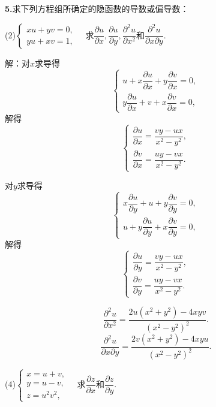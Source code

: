\documentclass[12pt, a4paper]{article}
\begin{document}
\textbf{5.}求下列方程组所确定的隐函数的导数或偏导数：

(2)\(\begin{cases}
xu + yv = 0, \\
yu + xv = 1,
\end{cases} \quad\)求\(\dfrac{\partial u}{\partial x}, \dfrac{\partial u}{\partial y}, \dfrac{\partial^2 u}{\partial x^2}\)和\(\dfrac{\partial^2 u}{\partial x \partial y}\).

解：对\(x\)求导得
\[\begin{cases}
u + x\dfrac{\partial u}{\partial x} + y\dfrac{\partial v}{\partial x} = 0, \\
y\dfrac{\partial u}{\partial x} + v + x\dfrac{\partial v}{\partial x} = 0,
\end{cases}\]
解得
\[\begin{cases}
\dfrac{\partial u}{\partial x} = \dfrac{vy - ux}{x^2 - y^2}, \\
\dfrac{\partial v}{\partial x} = \dfrac{uy - vx}{x^2 - y^2}.
\end{cases}\]

对\(y\)求导得
\[\begin{cases}
x\dfrac{\partial u}{\partial y} + u + y\dfrac{\partial v}{\partial y} = 0, \\
u + y\dfrac{\partial u}{\partial y} + x\dfrac{\partial v}{\partial y} = 0,
\end{cases}\]
解得
\[\begin{cases}
\dfrac{\partial u}{\partial y} = \dfrac{vy - ux}{x^2 - y^2}, \\
\dfrac{\partial v}{\partial y} = \dfrac{uy - vx}{x^2 - y^2}.
\end{cases}\]

\[\frac{\partial^2 u}{\partial x^2} = \frac{2u(x^2 + y^2) - 4xyv}{(x^2 - y^2)^2}.\]
\[\frac{\partial^2 u}{\partial x \partial y} = \frac{2v(x^2 + y^2) - 4xyu}{(x^2 - y^2)^2}.\]

(4)\(\begin{cases}
x = u + v, \\
y = u - v, \\
z = u^2v^2,
\end{cases} \quad\)求\(\dfrac{\partial z}{\partial x}\)和\(\dfrac{\partial z}{\partial y}\).
\end{document}
